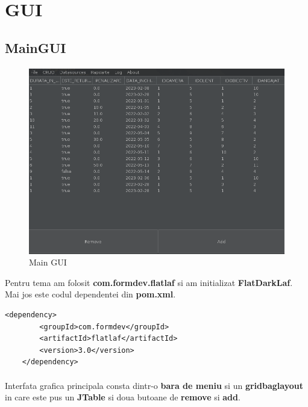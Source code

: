 \documentclass[oneside]{article}
\begin{document}
\section[GUI]{GUI}
\subsection[MainGUI]{MainGUI}
\paragraph{}
\begin{figure}[ht]
    \centering
    \noindent\includegraphics[scale=0.4]{program.png}
    \caption{Main GUI}
    \label{fig:maingui}
\end{figure}

Pentru tema am folosit \textbf{com.formdev.flatlaf} si am initializat \textbf{FlatDarkLaf}. Mai jos este codul dependentei din \textbf{pom.xml}.
\begin{center}
    \begin{lstlisting}[language=pom]
    <dependency>
        <groupId>com.formdev</groupId>
        <artifactId>flatlaf</artifactId>
        <version>3.0</version>
    </dependency>
    \end{lstlisting}
\end{center}

\paragraph{} Interfata grafica principala consta dintr-o \textbf{bara de meniu} si un \textbf{gridbaglayout} in care este pus un \textbf{JTable} si doua butoane de \textbf{remove} si \textbf{add}.
\end{document}
